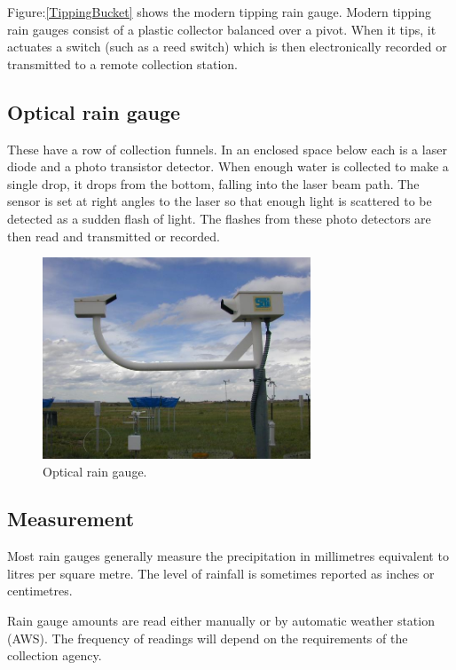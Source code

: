 \documentclass[a4paper,12pt]{report}
\begin{document}
Figure:\ref{TippingBucket} shows the modern tipping rain gauge.
Modern tipping rain gauges consist of a plastic collector balanced over a pivot. When it tips, it actuates a switch (such as a reed switch) 
which is then electronically recorded or transmitted to a remote collection station.

\subsection{Optical rain gauge}
These have a row of collection funnels. In an enclosed space below each is a laser diode and a photo transistor detector. 
When enough water is collected to make a single drop, it drops from the bottom, falling into the laser beam path. 
The sensor is set at right angles to the laser so that enough light is scattered to be detected as a sudden flash of light. 
The flashes from these photo detectors are then read and transmitted or recorded.\cite{wiki}

 \begin{figure}[h]
 \centering
  \includegraphics[height=6cm,width=.70\textwidth]{figures/optical_rain_gauge.jpg}
  \caption{Optical rain gauge.}
  \label{TOptical rain gauge}
 \end{figure}

\subsection{Measurement}
Most rain gauges generally measure the precipitation in millimetres equivalent to litres per square metre. The level of rainfall is sometimes reported as inches or centimetres.
\newline

Rain gauge amounts are read either manually or by automatic weather station (AWS). The frequency of readings will depend on the requirements of the collection agency.\cite{wiki} 


\end{document}
